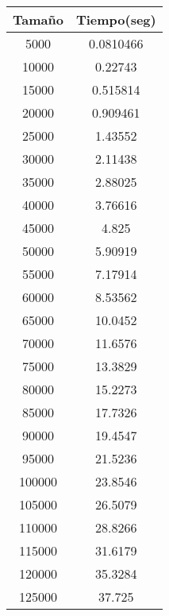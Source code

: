 \begin{longtable}{|c|c|}
\hline
\textbf{Tamaño} & \textbf{Tiempo(seg)} \\ \hline
5000   & 0.0810466   \\ \hline
10000  & 0.22743     \\ \hline
15000  & 0.515814    \\ \hline
20000  & 0.909461    \\ \hline
25000  & 1.43552     \\ \hline
30000  & 2.11438     \\ \hline
35000  & 2.88025     \\ \hline
40000  & 3.76616     \\ \hline
45000  & 4.825       \\ \hline
50000  & 5.90919     \\ \hline
55000  & 7.17914     \\ \hline
60000  & 8.53562     \\ \hline
65000  & 10.0452     \\ \hline
70000  & 11.6576     \\ \hline
75000  & 13.3829     \\ \hline
80000  & 15.2273     \\ \hline
85000  & 17.7326     \\ \hline
90000  & 19.4547     \\ \hline
95000  & 21.5236     \\ \hline
100000 & 23.8546     \\ \hline
105000 & 26.5079     \\ \hline
110000 & 28.8266     \\ \hline
115000 & 31.6179     \\ \hline
120000 & 35.3284     \\ \hline
125000 & 37.725      \\ \hline
\end{longtable}
